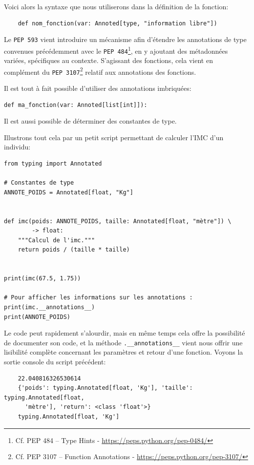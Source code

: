 \documentclass[a4paper,11pt]{book}
\begin{document}
Voici alors la syntaxe que nous utiliserons dans la définition de la fonction:
\begin{verbatim}
    def nom_fonction(var: Annoted[type, "information libre"])
\end{verbatim}
\medskip

Le \texttt{PEP 593} vient introduire un mécanisme afin d'étendre les annotations de type convenues précédemment avec le \texttt{PEP 484}\footnote{Cf. PEP 484 – Type Hints - \url{https://peps.python.org/pep-0484/}}, en y ajoutant des métadonnées variées, spécifiques au contexte. S'agissant des fonctions, cela vient en complément du \texttt{PEP 3107}\footnote{Cf. PEP 3107 – Function Annotations - \url{https://peps.python.org/pep-3107/}} relatif aux annotations des fonctions.
\medskip

Il est tout à fait possible d'utiliser des annotations imbriquées:
\begin{lstlisting}[caption=Les annotations imbriquées]
def ma_fonction(var: Annoted[list[int]]):
\end{lstlisting}
\medskip

Il est aussi possible de déterminer des constantes de type.
\medskip

Illustrons tout cela par un petit script permettant de calculer l'IMC d'un individu:
\begin{lstlisting}[caption=Exemple d'annotations de type avec la fonction \texttt{Annoted}]
from typing import Annotated

# Constantes de type
ANNOTE_POIDS = Annotated[float, "Kg"]


def imc(poids: ANNOTE_POIDS, taille: Annotated[float, "mètre"]) \ 
        -> float:
    """Calcul de l'imc."""
    return poids / (taille * taille)


print(imc(67.5, 1.75))

# Pour afficher les informations sur les annotations :
print(imc.__annotations__)
print(ANNOTE_POIDS)
\end{lstlisting}
\medskip

Le code peut rapidement s'alourdir, mais en même temps cela offre la possibilité de documenter son code, et la méthode \verb|.__annotations__| vient nous offrir une lisibilité complète concernant les paramètres et retour d'une fonction. Voyons la sortie console du script précédent:
\begin{verbatim}
    22.040816326530614
    {'poids': typing.Annotated[float, 'Kg'], 'taille': typing.Annotated[float, 
      'mètre'], 'return': <class 'float'>}
    typing.Annotated[float, 'Kg']
\end{verbatim}
\medskip
\end{document}
